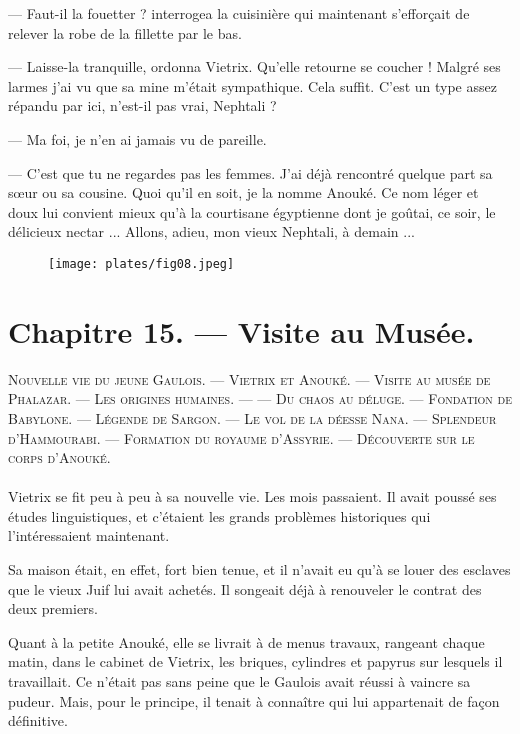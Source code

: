 \documentclass[a4paper, 11pt, oneside, polutonikogreek, french]{article}
\begin{document}
--- Faut-il la fouetter ? interrogea la cuisinière qui maintenant s'efforçait de relever la robe de la fillette par le bas.

--- Laisse-la tranquille, ordonna Vietrix. Qu'elle retourne se coucher ! Malgré ses larmes j'ai vu que sa mine m'était sympathique. Cela suffit. C'est un type assez répandu par ici, n'est-il pas vrai, Nephtali ?

--- Ma foi, je n'en ai jamais vu de pareille.

--- C'est que tu ne regardes pas les femmes. J'ai déjà rencontré quelque part sa sœur ou sa cousine. Quoi qu'il en soit, je la nomme Anouké. Ce nom léger et doux lui convient mieux qu'à la courtisane égyptienne dont je goûtai, ce soir, le délicieux nectar ... Allons, adieu, mon vieux Nephtali, à demain ...
\clearpage
\begin{figure}[H]
\centering
\texttt{[image: plates/fig08.jpeg]}
\end{figure}
\section{Chapitre 15. --- Visite au Musée.}
\begin{center}
\scshape
\small
Nouvelle vie du jeune Gaulois. --- Vietrix et Anouké. --- Visite au musée de Phalazar. --- Les origines humaines. --- --- Du chaos au déluge. --- Fondation de Babylone. --- Légende de Sargon. --- Le vol de la déesse Nana. --- Splendeur d'Hammourabi. --- Formation du royaume d'Assyrie. --- Découverte sur le corps d'Anouké.
\end{center}
\paragraph{}
Vietrix se fit peu à peu à sa nouvelle vie. Les mois passaient. Il avait poussé ses études linguistiques, et c'étaient les grands problèmes historiques qui l'intéressaient maintenant.

Sa maison était, en effet, fort bien tenue, et il n'avait eu qu'à se louer des esclaves que le vieux Juif lui avait achetés. Il songeait déjà à renouveler le contrat des deux premiers.

Quant à la petite Anouké, elle se livrait à de menus travaux, rangeant chaque matin, dans le cabinet de Vietrix, les briques, cylindres et papyrus sur lesquels il travaillait. Ce n'était pas sans peine que le Gaulois avait réussi à vaincre sa pudeur. Mais, pour le principe, il tenait à connaître qui lui appartenait de façon définitive.
\end{document}
